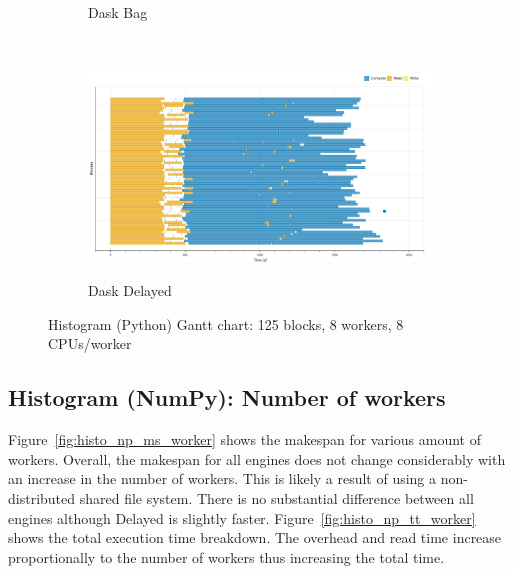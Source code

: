 \documentclass[conference]{IEEEtran}
\begin{document}
\begin{figure}[!b]
\begin{subfigure}[b]{\columnwidth}
        \caption{Dask Bag}\label{fig:histo_dask_bag_gantt}
    \end{subfigure}
    \\
    \begin{subfigure}[b]{\columnwidth}
        \href{https://mathdugre.github.io/paper-big-data-engines/dask-delayed-histo-baseline.html}{
        \includegraphics[clip,width=\columnwidth,
        height=0.15\textheight]{images/delayed_histo_gantt.png}}
        \caption{Dask Delayed}\label{fig:histo_dask_delayed_gantt}
    \end{subfigure}
    \caption{Histogram (Python) Gantt chart: 125 blocks, 8 workers, 8
    CPUs/worker}\label{fig:histo_gantt}
\end{figure}

\subsection{Histogram (NumPy): Number of workers}
Figure~\ref{fig:histo_np_ms_worker} shows the makespan for various amount of workers.
Overall, the makespan for all engines does not change considerably with an increase
in the number of workers. This is likely a result of using a non-distributed
shared file system. There is no
substantial difference between all engines although Delayed is slightly faster.
Figure~\ref{fig:histo_np_tt_worker} shows the total execution time
breakdown. The overhead and read time increase proportionally to the number
of workers thus increasing the total time. 
\end{document}
